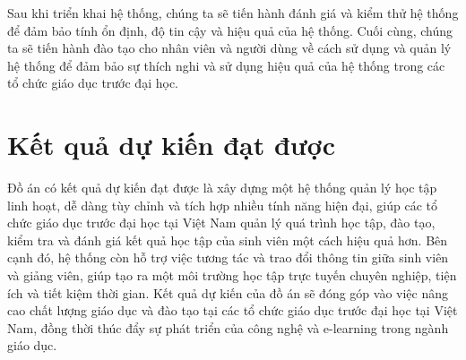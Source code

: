 \documentclass[../Thesis.tex]{subfiles}
\begin{document}
Sau khi triển khai hệ thống, chúng ta sẽ tiến hành đánh giá và kiểm thử hệ thống để đảm bảo tính ổn định, độ tin cậy và hiệu quả của hệ thống. Cuối cùng, chúng ta sẽ tiến hành đào tạo cho nhân viên và người dùng về cách sử dụng và quản lý hệ thống để đảm bảo sự thích nghi và sử dụng hiệu quả của hệ thống trong các tổ chức giáo dục trước đại học.

\section{Kết quả dự kiến đạt được}

Đồ án có kết quả dự kiến đạt được là xây dựng một hệ thống quản lý học tập linh hoạt, dễ dàng tùy chỉnh và tích hợp nhiều tính năng hiện đại, giúp các tổ chức giáo dục trước đại học tại Việt Nam quản lý quá trình học tập, đào tạo, kiểm tra và đánh giá kết quả học tập của sinh viên một cách hiệu quả hơn. Bên cạnh đó, hệ thống còn hỗ trợ việc tương tác và trao đổi thông tin giữa sinh viên và giảng viên, giúp tạo ra một môi trường học tập trực tuyến chuyên nghiệp, tiện ích và tiết kiệm thời gian. Kết quả dự kiến của đồ án sẽ đóng góp vào việc nâng cao chất lượng giáo dục và đào tạo tại các tổ chức giáo dục trước đại học tại Việt Nam, đồng thời thúc đẩy sự phát triển của công nghệ và e-learning trong ngành giáo dục.
\end{document}
